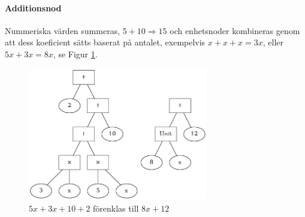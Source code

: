 \documentclass[12pt,a4paper]{article}
\begin{document}
\paragraph{Additionsnod}
Nummeriska värden summeras, \(5 + 10 \Rightarrow 15\) och enhetsnoder kombineras genom att dess koeficient sätts baserat på antalet, exempelvis \(x + x + x = 3x\), eller \(5x + 3x = 8x\), se Figur \ref{fig:2321}.
\begin{figure}[H]
  \centering
  \includegraphics[width=0.7\textwidth]{image-merged2}
  \caption{\(5x + 3x + 10 + 2\) förenklas till \(8x + 12\)}
  \label{fig:2321}
\end{figure}
\end{document}
